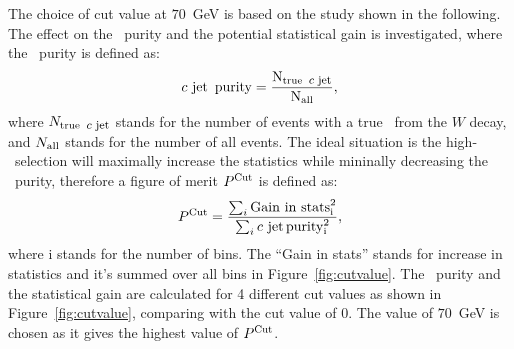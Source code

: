The choice of cut value at $70$~GeV is based on the
study shown in the following. 
The effect on the \cjet\ purity and the potential statistical gain is investigated, 
where the \cjet\ purity is defined as:
\begin{equation}
\mathop{\mbox{$c$ $\rm{jet}$}}\ \rm{purity} = \frac{N_{\rm{true}\ \mathop{\footnotesize{\mbox{$c$ $\rm{jet}$}}}\normalsize}}{N_{\rm{all}}},
\end{equation}
where $N_{\rm{true}\ \mathop{\footnotesize{\mbox{$c$ $\rm{jet}$}}}\normalsize}$ stands for the number of events with a 
true \cjet\ from the $W$ decay, and $N_{\rm{all}}$ stands for the number of all events. 
The ideal situation is the high-\pt\ selection will maximally increase the 
statistics while mininally decreasing the \cjet\ purity, therefore a figure of merit $P^{\rm{Cut}}$
is defined as:
\[P^{\rm{Cut}} = \frac{\sum_i{\rm{Gain\ in\ stats}^2_i}}{\sum_i{\cjetineq \rm{purity}^2_i }}, \]
where i stands for the number of bins. The ``Gain in stats'' stands for increase in 
statistics and it's summed over all bins in Figure~\ref{fig:cutvalue}.
The \cjet\ purity and the statistical gain are calculated for 4 different cut 
values as shown in Figure~\ref{fig:cutvalue}, comparing with the cut value of 0. 
The value of $70$~GeV is chosen as it gives the highest value of $P^{\rm{Cut}}$. 


